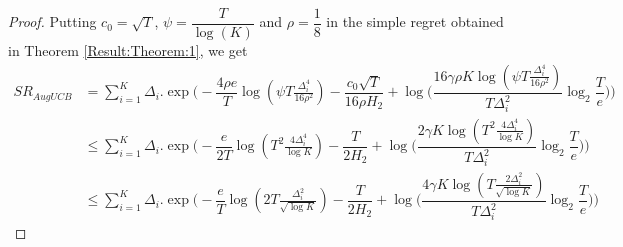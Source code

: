\begin{proof}
Putting $c_{0}=\sqrt{T}$, $\psi=\dfrac{T}{\log (K)}$ and $\rho=\dfrac{1}{8}$ in the simple regret obtained in Theorem \ref{Result:Theorem:1}, we get
\begin{align*}
SR_{AugUCB} &= \sum_{i=1}^{K} \Delta_{i}. \exp\bigg(-\dfrac{4\rho e}{T}\log (\psi T\frac{\Delta_{i}^{4}}{16\rho^{2}})-\dfrac{c_{0}\sqrt{T}}{16\rho H_{2}} + \log \big( \dfrac{16\gamma\rho K\log (\psi T \frac{\Delta_{i}^{4}}{16\rho^{2}})}{T\Delta_{i}^{2}}\log_{2}\dfrac{T}{e} \big) \bigg)\\
&\leq \sum_{i=1}^{K} \Delta_{i}.\exp\bigg(-\dfrac{e}{2T}\log ( T^{2}\frac{4\Delta_{i}^{4}}{\log K})-\dfrac{T}{2 H_{2}} + \log \big( \dfrac{2\gamma K\log ( T^{2} \frac{4\Delta_{i}^{4}}{\log K})}{T\Delta_{i}^{2}}\log_{2}\dfrac{T}{e} \big) \bigg)\\
&\leq \sum_{i=1}^{K} \Delta_{i}.\exp\bigg(-\dfrac{e}{T}\log ( 2T\frac{\Delta_{i}^{2}}{\sqrt{\log K}})-\dfrac{T}{2 H_{2}} + \log \big( \dfrac{4\gamma K\log ( T \frac{2\Delta_{i}^{2}}{\sqrt{\log K}})}{T\Delta_{i}^{2}}\log_{2}\dfrac{T}{e} \big) \bigg)
\end{align*} 

\end{proof}